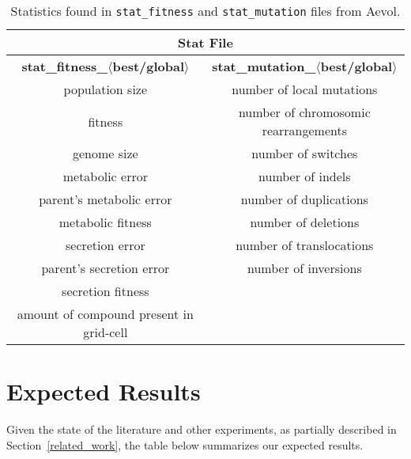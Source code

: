 \begin{table}[H]
	\centering
	\begin{tabular}{ |c|c| }
		\hline
		\multicolumn{2}{|c|}{\textbf{Stat File}} \\
		\hline
		\textbf{stat\_fitness\_$\langle$best/global$\rangle$} &
		\textbf{stat\_mutation\_$\langle$best/global$\rangle$} \\
		\hline \hline
		population size & number of local mutations \\
		fitness & number of chromosomic rearrangements \\
		genome size & number of switches \\
		metabolic error & number of indels \\
		parent's metabolic error & number of duplications \\
		metabolic fitness & number of deletions \\
		secretion error & number of translocations \\
		parent's secretion error & number of inversions \\
		secretion fitness & \\ 
		amount of compound present in grid-cell & \\
		\hline
	\end{tabular}	
	\caption[Aevol's stats: fitness and mutation]{Statistics found in \texttt{stat\_fitness} and \texttt{stat\_mutation} files from Aevol.}
	\label{table:aevol_stats_fitness_and_mutation}
\end{table}

\section{Expected Results}
Given the state of the literature and other experiments, as partially described in Section~\ref{related_work}, the table below summarizes our expected results. 





